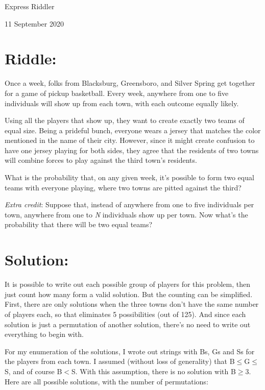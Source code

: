 \documentclass{article}
\begin{document}
\pagestyle{empty} %

\begin{center}
{\LARGE Express Riddler}

\vspace{0.15in}

{\Large 11 September 2020}
\end{center}


\section*{Riddle:}

Once a week, folks from Blacksburg, Greensboro, and Silver Spring get together for a game of pickup basketball.
Every week, anywhere from one to five individuals will show up from each town, with each outcome equally likely.

Using all the players that show up, they want to create exactly two teams of equal size.
Being a prideful bunch, everyone wears a jersey that matches the color mentioned in the name of their city.
However, since it might create confusion to have one jersey playing for both sides, they agree that the residents of two towns will combine forces to play against the third town's residents.

What is the probability that, on any given week, it's possible to form two equal teams with everyone playing, where two towns are pitted against the third?

\textit{Extra credit}: Suppose that, instead of anywhere from one to five individuals per town, anywhere from one to \textit{N} individuals show up per town.
Now what's the probability that there will be two equal teams?

\section*{Solution:}

It is possible to write out each possible group of players for this problem, then just count how many form a valid solution.
But the counting can be simplified.
First, there are only solutions when the three towns don't have the same number of players each, so that eliminates 5 possibilities (out of 125).
And since each solution is just a permutation of another solution, there's no need to write out everything to begin with.

For my enumeration of the solutions, I wrote out strings with Bs, Gs and Ss for the players from each town. I assumed (without loss of generality) that B$\leq$G$\leq$S, and of course B$<$S.
With this assumption, there is no solution with B$\geq$3.
Here are all possible solutions, with the number of permutations:
\end{document}
